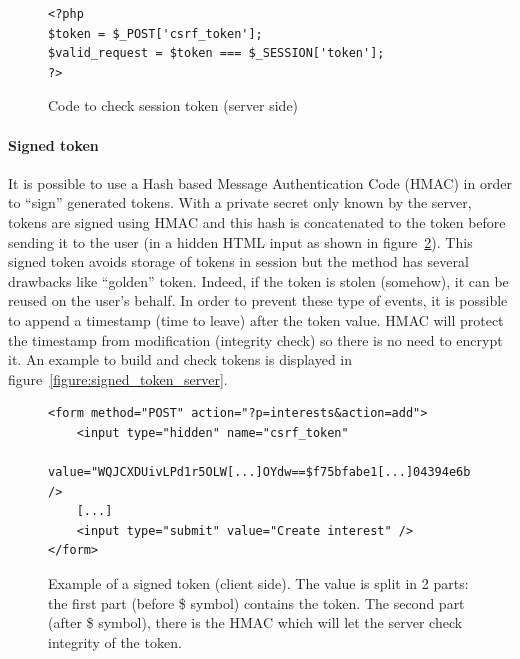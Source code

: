 \documentclass[a4paper,11pt,openany]{report}
\begin{document}
  \begin{figure}[h!t]
  \begin{verbatim}
<?php
$token = $_POST['csrf_token'];
$valid_request = $token === $_SESSION['token'];
?>
  \end{verbatim}
  \caption{Code to check session token (server side)}
  \label{figure:session_token_server}
  \end{figure}
  
  \paragraph{Signed token} %
  It is possible to use a Hash based Message Authentication Code (HMAC) in order to ``sign'' 
  generated tokens. With a private secret only known by the server, tokens are signed using 
  HMAC and this hash is concatenated to the token before sending it to the user (in a hidden 
  HTML input as shown in figure~\ref{figure:signed_token_client}). This signed token avoids 
  storage of tokens in session but the method has several drawbacks like ``golden'' token. 
  Indeed, if the token is stolen (somehow), it can be reused on the user's behalf. In order 
  to prevent these type of events, it is possible to append a timestamp (time to leave) after 
  the token value. HMAC will protect the timestamp from modification (integrity 
  check) so there is no need to encrypt it. An example to build and check tokens is displayed 
  in figure~\ref{figure:signed_token_server}.
  
  \begin{figure}[h!t]
  \begin{verbatim}
<form method="POST" action="?p=interests&action=add">
    <input type="hidden" name="csrf_token" 
        value="WQJCXDUivLPd1r5OLW[...]OYdw==$f75bfabe1[...]04394e6b" />
    [...]
    <input type="submit" value="Create interest" />
</form>
  \end{verbatim}
  \caption{Example of a signed token (client side). The value is split in 2 parts: the first part 
  (before \$ symbol) contains the token. The second part (after \$ symbol), there is the HMAC which 
  will let the server check integrity of the token.}
  \label{figure:signed_token_client}
  \end{figure}
  
\end{document}
